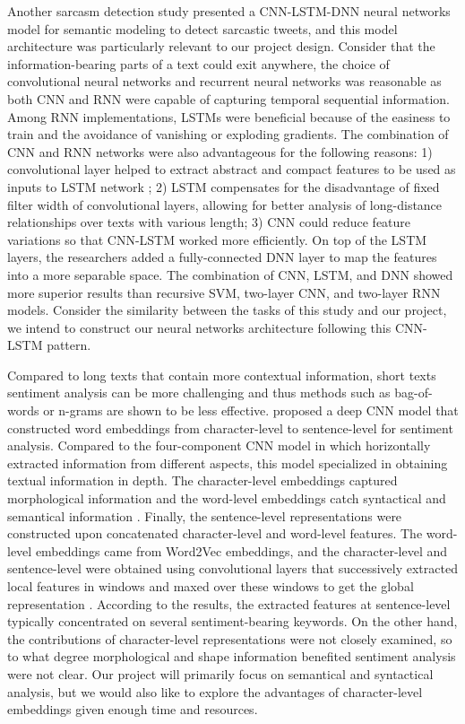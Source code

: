 \documentclass[12pt]{diazessay} %
\begin{document}
Another sarcasm detection study \citep{ghosh2016} presented a CNN-LSTM-DNN neural networks model for semantic modeling to detect sarcastic tweets, and this model architecture was particularly relevant to our project design. Consider that the information-bearing parts of a text could exit anywhere, the choice of convolutional neural networks and recurrent neural networks was reasonable as both CNN and RNN were capable of capturing temporal sequential information. Among RNN implementations, LSTMs were beneficial because of the easiness to train and the avoidance of vanishing or exploding gradients. The combination of CNN and RNN networks were also advantageous for the following reasons: 1) convolutional layer helped to extract abstract and compact features to be used as inputs to LSTM network \citep{chan2015}; 2) LSTM compensates for the disadvantage of fixed filter width of convolutional layers, allowing for better analysis of long-distance relationships over texts with various length; 3) CNN could reduce feature variations so that CNN-LSTM worked more efficiently\citep{ghosh2016}. On top of the LSTM layers, the researchers added a fully-connected DNN layer to map the features into a more separable space. The combination of CNN, LSTM, and DNN showed more superior results than recursive SVM, two-layer CNN, and two-layer RNN models\citep{ghosh2016}. Consider the similarity between the tasks of this study and our project, we intend to construct our neural networks architecture following this CNN-LSTM pattern. 

Compared to long texts that contain more contextual information, short texts sentiment analysis can be more challenging and thus methods such as bag-of-words or n-grams are shown to be less effective\citep{barbosa2010, santos2014}. \citep{santos2014} proposed a deep CNN model that constructed word embeddings from character-level to sentence-level for sentiment analysis. Compared to the four-component CNN model in \citep{poria2017} which horizontally extracted information from different aspects, this model specialized in obtaining textual information in depth. The character-level embeddings captured morphological information and the word-level embeddings catch syntactical and semantical information \citep{santos2014}. Finally, the sentence-level representations were constructed upon concatenated character-level and word-level features. The word-level embeddings came from Word2Vec embeddings, and the character-level and sentence-level were obtained using convolutional layers that successively extracted local features in windows and maxed over these windows to get the global representation \citep{santos2014}. According to the results, the extracted features at sentence-level typically concentrated on several sentiment-bearing keywords. On the other hand, the contributions of character-level representations were not closely examined, so to what degree morphological and shape information benefited sentiment analysis were not clear. Our project will primarily focus on semantical and syntactical analysis, but we would also like to explore the advantages of character-level embeddings given enough time and resources. 
\end{document}
